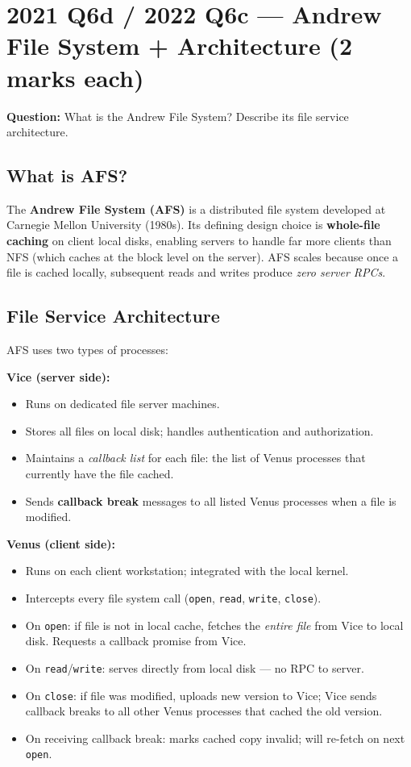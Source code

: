 \documentclass[12pt,a4paper]{article}
\begin{document}
\section{2021 Q6d / 2022 Q6c --- Andrew File System + Architecture (2 marks each)}

\textbf{Question:} What is the Andrew File System? Describe its file service architecture.

\subsection*{What is AFS?}

The \textbf{Andrew File System (AFS)} is a distributed file system developed at Carnegie Mellon University (1980s). Its defining design choice is \textbf{whole-file caching} on client local disks, enabling servers to handle far more clients than NFS (which caches at the block level on the server). AFS scales because once a file is cached locally, subsequent reads and writes produce \emph{zero server RPCs}.

\subsection*{File Service Architecture}

AFS uses two types of processes:

\textbf{Vice (server side):}
\begin{itemize}[noitemsep]
  \item Runs on dedicated file server machines.
  \item Stores all files on local disk; handles authentication and authorization.
  \item Maintains a \emph{callback list} for each file: the list of Venus processes that currently have the file cached.
  \item Sends \textbf{callback break} messages to all listed Venus processes when a file is modified.
\end{itemize}

\textbf{Venus (client side):}
\begin{itemize}[noitemsep]
  \item Runs on each client workstation; integrated with the local kernel.
  \item Intercepts every file system call (\texttt{open}, \texttt{read}, \texttt{write}, \texttt{close}).
  \item On \texttt{open}: if file is not in local cache, fetches the \emph{entire file} from Vice to local disk. Requests a callback promise from Vice.
  \item On \texttt{read}/\texttt{write}: serves directly from local disk --- no RPC to server.
  \item On \texttt{close}: if file was modified, uploads new version to Vice; Vice sends callback breaks to all other Venus processes that cached the old version.
  \item On receiving callback break: marks cached copy invalid; will re-fetch on next \texttt{open}.
\end{itemize}
\end{document}
